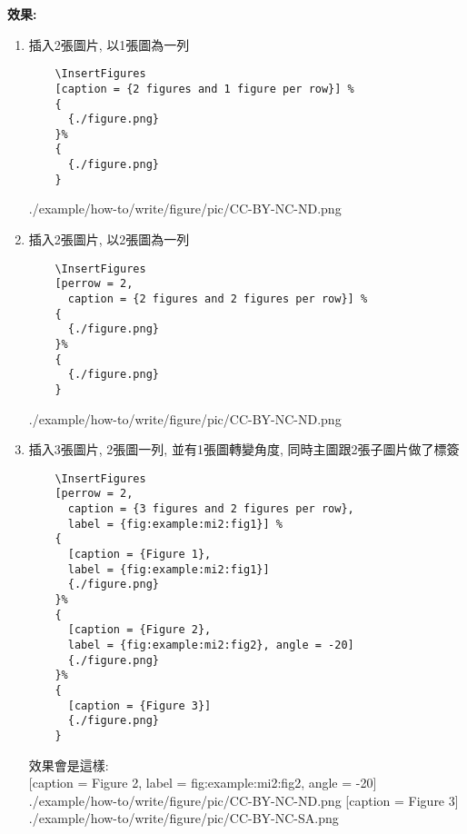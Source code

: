   {\bf 效果:}
  \begin{enumerate}
  \item
  {
    插入2張圖片, 以1張圖為一列
    \begin{verbatim}
    \InsertFigures
    [caption = {2 figures and 1 figure per row}] %
    {
      {./figure.png}
    }%
    {
      {./figure.png}
    }
    \end{verbatim}
    {
      {./example/how-to/write/figure/pic/CC-BY-NC-ND.png}
    }
  } %
  \item
  {
    插入2張圖片, 以2張圖為一列
    \begin{verbatim}
    \InsertFigures
    [perrow = 2,
      caption = {2 figures and 2 figures per row}] %
    {
      {./figure.png}
    }%
    {
      {./figure.png}
    }
    \end{verbatim}
    {
      {./example/how-to/write/figure/pic/CC-BY-NC-ND.png}
    }
  } %

  \newpage
  \item
  {
    插入3張圖片, 2張圖一列, 並有1張圖轉變角度, 同時主圖跟2張子圖片做了標簽
    \begin{verbatim}
    \InsertFigures
    [perrow = 2,
      caption = {3 figures and 2 figures per row},
      label = {fig:example:mi2:fig1}] %
    {
      [caption = {Figure 1},
      label = {fig:example:mi2:fig1}]
      {./figure.png}
    }%
    {
      [caption = {Figure 2},
      label = {fig:example:mi2:fig2}, angle = -20]
      {./figure.png}
    }%
    {
      [caption = {Figure 3}]
      {./figure.png}
    }
    \end{verbatim}

    效果會是這樣: \\
    {
      [caption = {Figure 2},
      label = {fig:example:mi2:fig2},
      angle = -20]
      {./example/how-to/write/figure/pic/CC-BY-NC-ND.png}
    }%
    {
      [caption = {Figure 3}]
      {./example/how-to/write/figure/pic/CC-BY-NC-SA.png}
    }%

}
\end{enumerate}
